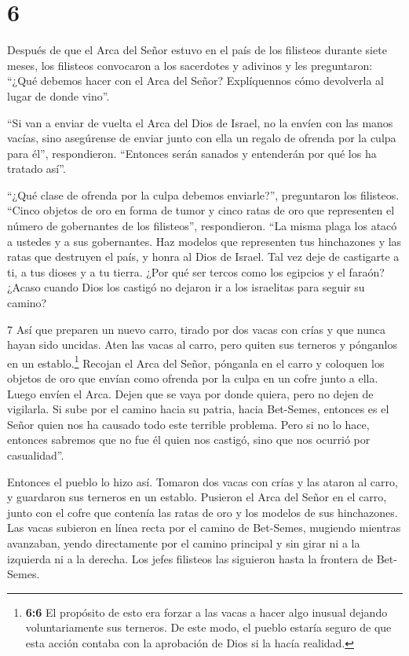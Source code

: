 \hypertarget{section-5}{%
\section{6}\label{section-5}}

 Después de que el Arca del Señor estuvo en el país de los
filisteos durante siete meses,  los filisteos convocaron a
los sacerdotes y adivinos y les preguntaron: ``¿Qué debemos hacer con el
Arca del Señor? Explíquennos cómo devolverla al lugar de donde vino''.

 ``Si van a enviar de vuelta el Arca del Dios de Israel, no
la envíen con las manos vacías, sino asegúrense de enviar junto con ella
un regalo de ofrenda por la culpa para él'', respondieron. ``Entonces
serán sanados y entenderán por qué los ha tratado así''.

 ``¿Qué clase de ofrenda por la culpa debemos enviarle?'',
preguntaron los filisteos. ``Cinco objetos de oro en forma de tumor y
cinco ratas de oro que representen el número de gobernantes de los
filisteos'', respondieron. ``La misma plaga los atacó a ustedes y a sus
gobernantes.  Haz modelos que representen tus hinchazones y
las ratas que destruyen el país, y honra al Dios de Israel. Tal vez deje
de castigarte a ti, a tus dioses y a tu tierra.  ¿Por qué
ser tercos como los egipcios y el faraón? ¿Acaso cuando Dios los castigó
no dejaron ir a los israelitas para seguir su camino?

7 Así que preparen un nuevo carro, tirado por dos vacas con crías y que
nunca hayan sido uncidas. Aten las vacas al carro, pero quiten sus
terneros y pónganlos en un establo.\footnote{\textbf{6:6} El propósito
  de esto era forzar a las vacas a hacer algo inusual dejando
  voluntariamente sus terneros. De este modo, el pueblo estaría seguro
  de que esta acción contaba con la aprobación de Dios si la hacía
  realidad.}  Recojan el Arca del Señor, pónganla en el
carro y coloquen los objetos de oro que envían como ofrenda por la culpa
en un cofre junto a ella. Luego envíen el Arca. Dejen que se vaya por
donde quiera,  pero no dejen de vigilarla. Si sube por el
camino hacia su patria, hacia Bet-Semes, entonces es el Señor quien nos
ha causado todo este terrible problema. Pero si no lo hace, entonces
sabremos que no fue él quien nos castigó, sino que nos ocurrió por
casualidad''.

 Entonces el pueblo lo hizo así. Tomaron dos vacas con
crías y las ataron al carro, y guardaron sus terneros en un establo.
 Pusieron el Arca del Señor en el carro, junto con el cofre
que contenía las ratas de oro y los modelos de sus hinchazones.
 Las vacas subieron en línea recta por el camino de
Bet-Semes, mugiendo mientras avanzaban, yendo directamente por el camino
principal y sin girar ni a la izquierda ni a la derecha. Los jefes
filisteos las siguieron hasta la frontera de Bet-Semes.

